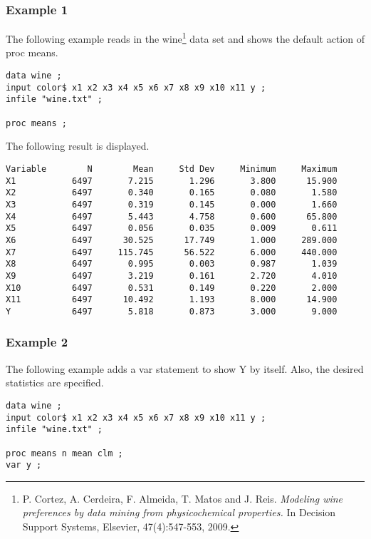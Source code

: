 \documentclass[12pt]{article}
\begin{document}
\subsubsection*{Example 1}

The following example reads in the wine\footnote{
P. Cortez, A. Cerdeira, F. Almeida, T. Matos and J. Reis.
{\it Modeling wine preferences by data mining from physicochemical properties.}
In Decision Support Systems, Elsevier, 47(4):547-553, 2009.}
data set and shows the default action of proc means.

{\footnotesize\begin{verbatim}
data wine ;
input color$ x1 x2 x3 x4 x5 x6 x7 x8 x9 x10 x11 y ;
infile "wine.txt" ;

proc means ;
\end{verbatim}}

The following result is displayed.

{\footnotesize\begin{verbatim}
Variable        N        Mean     Std Dev     Minimum     Maximum
X1           6497       7.215       1.296       3.800      15.900
X2           6497       0.340       0.165       0.080       1.580
X3           6497       0.319       0.145       0.000       1.660
X4           6497       5.443       4.758       0.600      65.800
X5           6497       0.056       0.035       0.009       0.611
X6           6497      30.525      17.749       1.000     289.000
X7           6497     115.745      56.522       6.000     440.000
X8           6497       0.995       0.003       0.987       1.039
X9           6497       3.219       0.161       2.720       4.010
X10          6497       0.531       0.149       0.220       2.000
X11          6497      10.492       1.193       8.000      14.900
Y            6497       5.818       0.873       3.000       9.000
\end{verbatim}}

\subsubsection*{Example 2}

The following example adds a var statement to show Y by itself.
Also, the desired statistics are specified.

{\footnotesize\begin{verbatim}
data wine ;
input color$ x1 x2 x3 x4 x5 x6 x7 x8 x9 x10 x11 y ;
infile "wine.txt" ;

proc means n mean clm ;
var y ;
\end{verbatim}}
\end{document}
